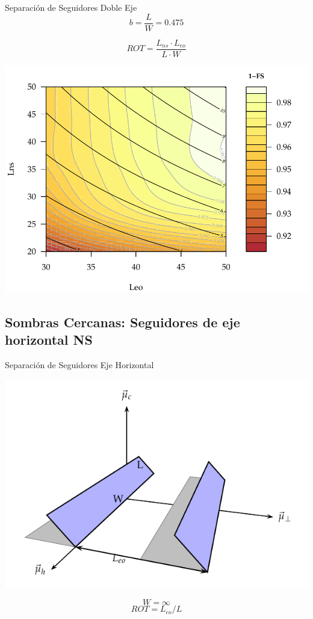 \documentclass[xcolor={usenames,svgnames,dvipsnames}]{beamer}
\begin{document}
\begin{frame}[label={sec:org3bee000}]{Separación de Seguidores Doble Eje}
$$b=\frac{L}{W}=0.475$$

$$ROT=\frac{L_{ns}\cdot L_{eo}}{L \cdot W}$$

\begin{center}
\includegraphics[width=.9\linewidth]{../figs/AbacoSeguidor2X_Ene10.pdf}
\end{center}
\end{frame}


\subsection{Sombras Cercanas: Seguidores de eje horizontal NS}
\label{sec:orgfa8c97a}

\begin{frame}[label={sec:org2d6347a}]{Separación de Seguidores Eje Horizontal}
\begin{center}
\includegraphics[width=.9\linewidth]{../figs/SombrasHoriz.pdf}
\end{center}

$$W=\infty$$ $$ROT=L_{eo}/L$$
\end{frame}
\end{document}
